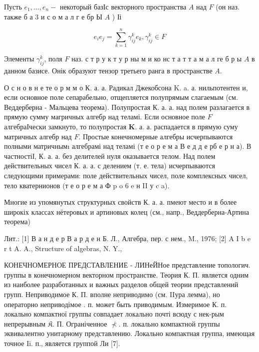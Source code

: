 \documentclass[10pt]{article}
\begin{document}
Пусть $e_{1}, \ldots, e_{n}-$ некоторый базІс векторного пространства $A$ над $F$ (он наз. также б а 3 и с о м а л г е бр Ы $A$ ) Іі



\[

e_{i} e_{j}=\sum_{k=1}^{n} \gamma_{i j}^{k} e_{k}, \gamma_{i j}^{k} \in F

\]



Элементы $\gamma_{i j}^{k}$, поля $F$ наз. с т р у к т у р ны м и ко нс т а т т а м а л ге б р ы $A$ в данном базисе. Онік образуют тензор третьего ранга в пространстве $A$.



О с н о в н е те о р м м о К. а. а. Радикал Джекобсона K. a. а. нильпотентен и, если основное поле сепарабельно, отщепляется полупрямым слагаемым (см. Веддерберна - Мальцева теорема). Полупростая К. а. а. над полем разлагается в прямую сумму магричных алгебр над теламі. Если основное поле $F$ алгебраІчески замкнуто, то полупростая $\mathbf{K}$. а. а. распадается в прямую суму матричных алгебр над $F$. Простые конечномерные алгебры исчерпываются полными матричнымı алгебрамі над теламі (т е о р е м а В е д д е рб е р н а). В частностіІ, К. а. а. без делителей нуля оказывается телом. Над полем действительных чисел К. а. а. с делением (т. е. тела) исчерпываются следующими примерами: поле действительных чисел, поле комплексных чисел, тело кватернионов (т е о р е м а Ф p o 6 e н II у c a).



Многие из упомянутых структурных свойств К. а. а. пмеют место и в более широкіх классах нётеровых и артиновых колец (см., напр., Веддерберна-Артина теорема)



Лит.: [1] В а н д е р В а р д е н Б. Л., Алгебра, пер. с нем., M., 1976; [2] A I b e r t A. A., Structure of algebras, N. Y.,



КОНЕЧНОМЕРНОЕ ПРЕДСТАВЛЕНИЕ - ЛИНеЙНое представление топологич. группы в конечномерном векторном пространстве. Теория К. П. является одним из наиболее разработанных и важных разделов общей теории представлений групп. Неприводимое К. П. вполне неприводимо (см. IIура лемма), но операторно неприводімое . п. может быть приводимым. Измеримое К. п. локально компактної группы совпадает локально почті всюду с нек-рым непрерывным $\mathfrak{K}$. П. Ограніченное $\nprec$. п. локально компактной группы эквивалентно унитарному представлению. Локально компактная группа, имеющая точное Ii. п., является группой Ли [7].
\end{document}
